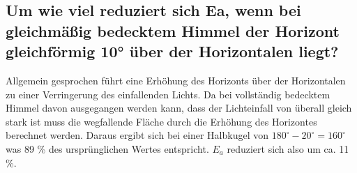 \subsection{Um wie viel reduziert sich Ea, wenn bei gleichmäßig bedecktem Himmel der Horizont
gleichförmig 10° über der Horizontalen liegt?}

Allgemein gesprochen führt eine Erhöhung des Horizonts über der Horizontalen zu einer Verringerung des einfallenden Lichts.
Da bei vollständig bedecktem Himmel davon ausgegangen werden kann, dass der Lichteinfall von überall gleich stark ist muss die wegfallende Fläche durch die Erhöhung des Horizontes berechnet werden. Daraus ergibt sich bei einer Halbkugel von $180^{\circ}-20^{\circ}=160^{\circ}$ was 89 \% des ursprünglichen Wertes entspricht. $E_a$ reduziert sich also um ca. 11 \%. 




